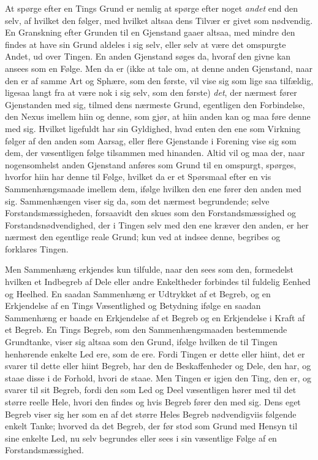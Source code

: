 \documentclass[12pt,a4paper]{book}
\newcommand{\apage}[1]{\marginnote{\footnotesize\textit{[#1]}}}
\begin{document}
At spørge efter en Tings Grund er nemlig at spørge efter noget \emph{andet} end
den selv, af hvilket \apage{89} den følger, med hvilket altsaa dens Tilvær er givet som
nødvendig. En Granskning efter Grunden til en Gjenstand gaaer altsaa, med mindre
den findes at have sin Grund aldeles i sig selv, eller selv at være det omspurgte
Andet, ud over Tingen. En anden Gjenstand søges da, hvoraf den givne kan ansees
som en Følge. Men da er (ikke at tale om, at denne anden Gjenstand, naar den er
af samme Art og Sphære, som den første, vil vise sig som lige saa tilfældig,
ligesaa langt fra at være nok i sig selv, som den første) \emph{det}, der nærmest fører
Gjenstanden med sig, tilmed dens nærmeste Grund, egentligen den Forbindelse, den
Nexus imellem hiin og denne, som gjør, at hiin anden kan og maa føre denne med
sig. Hvilket ligefuldt har sin Gyldighed, hvad enten den ene som Virkning følger
af den anden som Aarsag, eller flere Gjenstande i Forening vise sig som dem, der
væsentligen følge tilsammen med hinanden. Altid vil og maa der, naar
nogensomhelst anden Gjenstand anføres som Grund til en omspurgt, spørges, hvorfor
hiin har denne til Følge, hvilket da er et Spørsmaal efter en vis
Sammenhængsmaade imellem dem, ifølge hvilken den ene fører den anden med sig.
Sammenhængen viser sig da, som det nærmest begrundende; selve Forstandsmæssigheden,
forsaavidt den skues som den Forstandsmæssighed og Forstandsnødvendighed, der i
Tingen selv med den ene kræver den anden, er her nærmest \apage{90}  den egentlige reale
Grund; kun ved at indsee denne, begribes og forklares Tingen.

Men Sammenhæng erkjendes kun tilfulde, naar den sees som den, formedelst hvilken
et Indbegreb af Dele eller andre Enkeltheder forbindes til fuldelig Eenhed og
Heelhed. En saadan Sammenhæng er Udtrykket af et Begreb, og en Erkjendelse af en
Tings Væsentlighed og Betydning ifølge en saadan Sammenhæng er baade en
Erkjendelse af et Begreb og en Erkjendelse i Kraft af et Begreb. En Tings Begreb,
som den Sammenhængsmaaden bestemmende Grundtanke, viser sig altsaa som den Grund,
ifølge hvilken de til Tingen henhørende enkelte Led ere, som de ere. Fordi Tingen
er dette eller hiint, det er svarer til dette eller hiint Begreb, har den de
Beskaffenheder og Dele, den har, og staae disse i de Forhold, hvori de staae. Men
Tingen er igjen den Ting, den er, og svarer til sit Begreb, fordi den som Led og
Deel væsentligen hører med til det større reelle Hele, hvori den findes og hvis
Begreb fører den med sig. Dens eget Begreb viser sig her som en af det større
Heles Begreb nødvendigviis følgende enkelt Tanke; hvorved da det Begreb, der før
stod som Grund med Hensyn til sine enkelte Led, nu selv begrundes eller sees i sin
væsentlige Følge af en Forstandsmæssighed.
\end{document}
